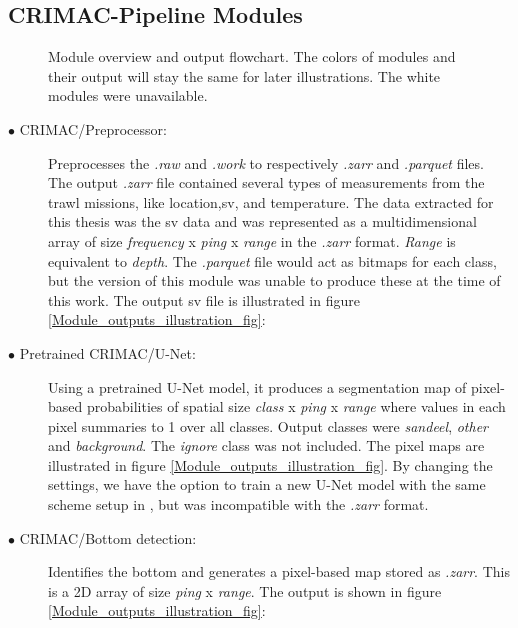             \subsection{CRIMAC-Pipeline Modules} \label{CRIMAC-pipeline}
              \begin{figure}[H]
                \centering
                
                \caption[Module overview]{Module overview and output flowchart. The colors of modules and  their output will stay the same for later illustrations. The white modules were unavailable.}
              	\medskip 
                \label{Module_overview_fig}
            \end{figure}

            \begin{description}
              \item[$\bullet$ CRIMAC/Preprocessor:] Preprocesses the \textit{.raw} and \textit{.work} to respectively \textit{.zarr} and \textit{.parquet} files. The output \textit{.zarr} file contained several types of measurements from the trawl missions, like location,\gls{sv}, and temperature. The data extracted for this thesis was the \gls{sv} data and was represented as a multidimensional array of size \textit{frequency} x \textit{ping} x \textit{range} in the  \textit{.zarr} format. \textit{Range} is equivalent to \textit{depth}. The \textit{.parquet} file would act as bitmaps for each class, but the version of this module was unable to produce these at the time of this work. The output \gls{sv} file is illustrated in figure \ref{Module_outputs_illustration_fig}:

              \item[$\bullet$ Pretrained CRIMAC/U-Net:] Using a pretrained U-Net model, it produces a segmentation map of pixel-based probabilities of spatial size \textit{class} x \textit{ping} x \textit{range} where values in each pixel summaries to 1 over all classes. Output classes were \textit{sandeel}, \textit{other} and \textit{background}. The \textit{ignore} class was not included. The pixel maps are illustrated in figure \ref{Module_outputs_illustration_fig}.  By changing the settings, we have the option to train a new U-Net model with the same scheme setup in \citeauthor{brautaset2020acoustic}, but was incompatible with the \textit{.zarr} format.
              
              \item[$\bullet$ CRIMAC/Bottom detection:] Identifies the bottom and generates a pixel-based map stored as \textit{.zarr}. This is a 2D array of size \textit{ping} x \textit{range}. The output is shown in figure \ref{Module_outputs_illustration_fig}:

            \end{description}
            
